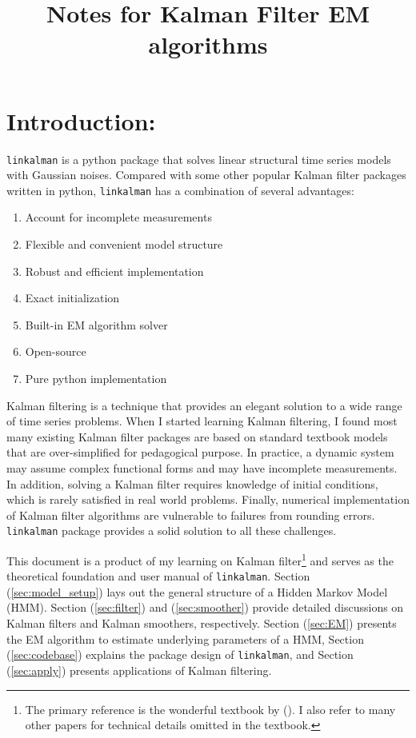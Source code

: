 \documentclass[12pt]{article}
\newenvironment{boenumerate}
    {\begin{enumerate}\renewcommand\labelenumi{\textbf\theenumi}}
    {\end{enumerate}}
\numberwithin{equation}{section}
\begin{document}
\title{Notes for Kalman Filter EM algorithms}

\section{Introduction:}
\texttt{linkalman} is a python package that solves linear structural time series models with Gaussian noises. Compared with some other popular Kalman filter packages written in python, \texttt{linkalman} has a combination of several advantages:
\begin{boenumerate}
    \item Account for incomplete measurements 
    \item Flexible and convenient model structure
    \item Robust and efficient implementation
    \item Exact initialization
    \item Built-in EM algorithm solver
    \item Open-source
    \item Pure python implementation 
\end{boenumerate}
Kalman filtering is a technique that provides an elegant solution to a wide range of time series problems. When I started learning Kalman filtering, I found most many existing Kalman filter packages are based on standard textbook models that are over-simplified for pedagogical purpose. In practice, a dynamic system may assume complex functional forms and may have incomplete measurements. In addition, solving a Kalman filter requires knowledge of initial conditions, which is rarely satisfied in real world problems. Finally, numerical implementation of Kalman filter algorithms are vulnerable to failures from rounding errors. \texttt{linkalman} package provides a solid solution to all these challenges. 

This document is a product of my learning on Kalman filter\footnote{The primary reference is the wonderful textbook by (\cite{durbin_koopman_2001}). I also refer to many other papers for technical details omitted in the textbook.} and serves as the theoretical foundation and user manual of \texttt{linkalman}. Section (\ref{sec:model_setup}) lays out the general structure of a Hidden Markov Model (HMM). Section (\ref{sec:filter}) and (\ref{sec:smoother}) provide detailed discussions on Kalman filters and Kalman smoothers, respectively. Section (\ref{sec:EM}) presents the EM algorithm to estimate underlying parameters of a HMM, Section (\ref{sec:codebase}) explains the package design of \texttt{linkalman}, and Section (\ref{sec:apply}) presents applications of Kalman filtering. 
\end{document}
